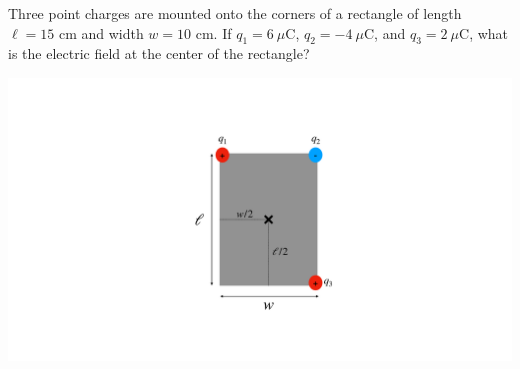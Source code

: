 \question Three point charges are mounted onto the corners of a rectangle of length $\ell=15$ cm and width $w=10$ cm. If $q_1=6\ \mu$C, $q_2=-4\ \mu$C, and $q_3=2\ \mu$C, what is the electric field at the center of the rectangle?

\begin{center}
	\includegraphics[width=.4\textwidth]{p5diag1}
\end{center}